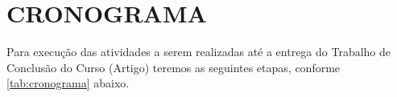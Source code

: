 % 
%


\chapter{CRONOGRAMA}

Para execução das atividades a serem realizadas até a entrega do Trabalho de Conclusão do Curso (Artigo) teremos as seguintes etapas, conforme \autoref{tab:cronograma} abaixo.

